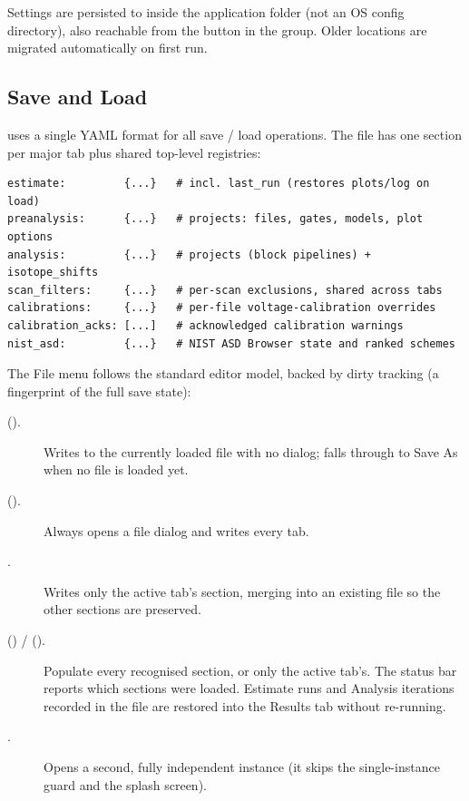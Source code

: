 Settings are persisted to  inside the
application folder (not an OS config directory), also reachable from
the  button in the  group. Older locations
are migrated automatically on first run.

\subsection{Save and Load}

\denis{} uses a single YAML format for all save / load operations.
The file has one section per major tab plus shared top-level
registries:

\begin{lstlisting}
estimate:         {...}   # incl. last_run (restores plots/log on load)
preanalysis:      {...}   # projects: files, gates, models, plot options
analysis:         {...}   # projects (block pipelines) + isotope_shifts
scan_filters:     {...}   # per-scan exclusions, shared across tabs
calibrations:     {...}   # per-file voltage-calibration overrides
calibration_acks: [...]   # acknowledged calibration warnings
nist_asd:         {...}   # NIST ASD Browser state and ranked schemes
\end{lstlisting}

The File menu follows the standard editor model, backed by
dirty tracking (a fingerprint of the full save state):

\begin{description}
    \item[ ().] Writes to the currently
        loaded file with no dialog; falls through to Save As when no
        file is loaded yet.
    \item[ ().] Always opens a
        file dialog and writes every tab.
    \item[.] Writes only the active tab's
        section, merging into an existing file so the other sections
        are preserved.
    \item[ () /
           ().] Populate every
        recognised section, or only the active tab's. The status bar
        reports which sections were loaded. Estimate runs and
        Analysis iterations recorded in the file are restored into
        the Results tab without re-running.
    \item[.] Opens a second, fully independent
        \denis{} instance (it skips the single-instance guard and
        the splash screen).
\end{description}

